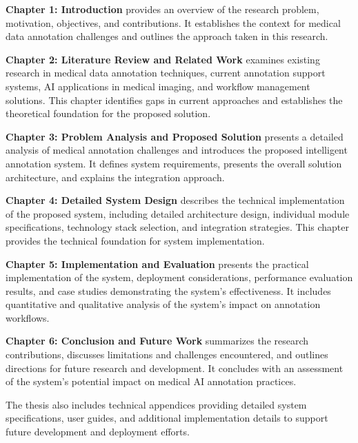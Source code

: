 \textbf{Chapter 1: Introduction} provides an overview of the research problem, motivation, objectives, and contributions. It establishes the context for medical data annotation challenges and outlines the approach taken in this research.

\textbf{Chapter 2: Literature Review and Related Work} examines existing research in medical data annotation techniques, current annotation support systems, AI applications in medical imaging, and workflow management solutions. This chapter identifies gaps in current approaches and establishes the theoretical foundation for the proposed solution.

\textbf{Chapter 3: Problem Analysis and Proposed Solution} presents a detailed analysis of medical annotation challenges and introduces the proposed intelligent annotation system. It defines system requirements, presents the overall solution architecture, and explains the integration approach.

\textbf{Chapter 4: Detailed System Design} describes the technical implementation of the proposed system, including detailed architecture design, individual module specifications, technology stack selection, and integration strategies. This chapter provides the technical foundation for system implementation.

\textbf{Chapter 5: Implementation and Evaluation} presents the practical implementation of the system, deployment considerations, performance evaluation results, and case studies demonstrating the system's effectiveness. It includes quantitative and qualitative analysis of the system's impact on annotation workflows.

\textbf{Chapter 6: Conclusion and Future Work} summarizes the research contributions, discusses limitations and challenges encountered, and outlines directions for future research and development. It concludes with an assessment of the system's potential impact on medical AI annotation practices.

The thesis also includes technical appendices providing detailed system specifications, user guides, and additional implementation details to support future development and deployment efforts. 